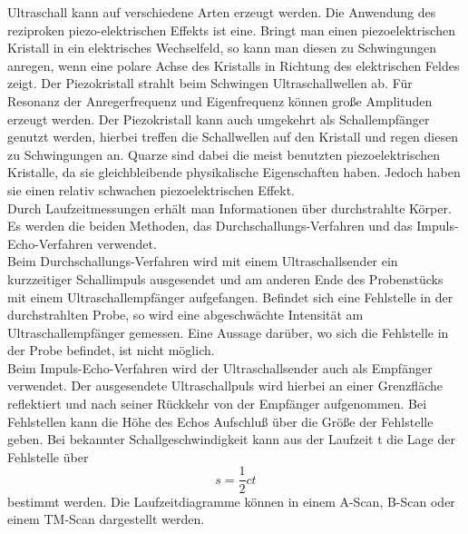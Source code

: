 Ultraschall kann auf verschiedene Arten erzeugt werden.
Die Anwendung des reziproken piezo-elektrischen Effekts ist eine.
Bringt man einen piezoelektrischen
Kristall in ein elektrisches Wechselfeld, so kann man diesen zu Schwingungen anregen, wenn eine polare Achse des Kristalls in Richtung des elektrischen Feldes zeigt. 
Der Piezokristall strahlt beim Schwingen Ultraschallwellen ab.
Für Resonanz der Anregerfrequenz und Eigenfrequenz können große Amplituden erzeugt werden.
Der Piezokristall kann auch umgekehrt als Schallempfänger genutzt werden, hierbei treffen die Schallwellen auf den Kristall und regen diesen zu Schwingungen an.
Quarze sind dabei die meist benutzten piezoelektrischen Kristalle, da sie gleichbleibende physikalische Eigenschaften haben. Jedoch haben sie einen relativ schwachen piezoelektrischen Effekt.\\

Durch Laufzeitmessungen erhält man Informationen über durchstrahlte Körper.
Es werden die beiden Methoden, das Durchschallungs-Verfahren und das Impuls-Echo-Verfahren verwendet.\\

Beim Durchschallungs-Verfahren wird mit einem Ultraschallsender ein kurzzeitiger Schallimpuls ausgesendet und am anderen Ende
des Probenstücks mit einem Ultraschallempfänger aufgefangen.
Befindet sich eine Fehlstelle in der durchstrahlten Probe, so wird eine abgeschwächte Intensität am Ultraschallempfänger gemessen. 
Eine Aussage darüber, wo sich die Fehlstelle in der Probe befindet, ist nicht möglich. \\

Beim Impuls-Echo-Verfahren wird der Ultraschallsender auch als Empfänger verwendet. 
Der ausgesendete Ultraschallpuls wird hierbei an einer Grenzfläche reflektiert und nach seiner Rückkehr von der Empfänger aufgenommen. 
Bei Fehlstellen kann die Höhe des Echos Aufschluß über die Größe der Fehlstelle geben. 
Bei bekannter Schallgeschwindigkeit kann aus der Laufzeit t die Lage der Fehlstelle über
\begin{equation}
    s = \frac{1}{2} c t
    \label{eqn:gl4}
\end{equation}
bestimmt werden.
Die Laufzeitdiagramme können in einem A-Scan, B-Scan oder einem TM-Scan dargestellt werden.